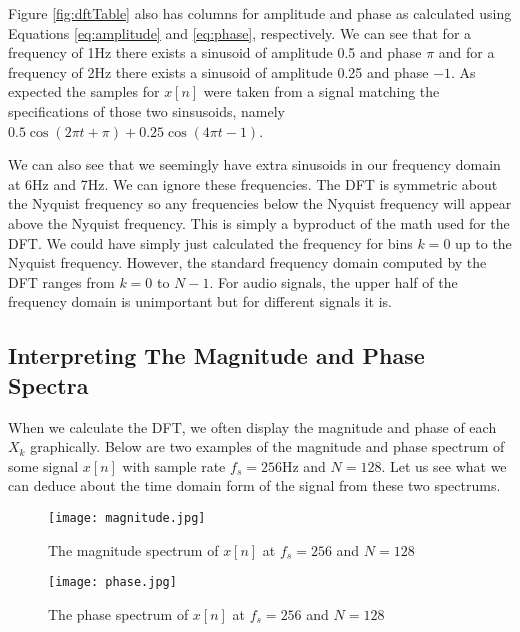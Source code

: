 Figure \ref{fig:dftTable} also has  columns for amplitude and phase as calculated using Equations 
\ref{eq:amplitude} and \ref{eq:phase},
respectively.  We can see that for a frequency of 1Hz there exists
 a sinusoid of amplitude 0.5 and phase $\pi$ and for a frequency of 2Hz there exists a sinusoid of 
 amplitude 0.25 and phase $-1$.  As expected the samples for $x[n]$ were taken from a signal 
 matching the specifications of those two sinsusoids, namely $0.5\cos(2\pi t + \pi) + 0.25\cos(4\pi t - 1)$.
 
 We can also see that we seemingly have extra sinusoids in our frequency domain at 6Hz and 7Hz.  
 We can ignore these frequencies.  The DFT is symmetric about the Nyquist frequency so any 
 frequencies below the Nyquist frequency will appear above the Nyquist frequency.  This is simply
 a byproduct of the math used for the DFT.  We could have simply just calculated the frequency
 for bins $k = 0$ up to the Nyquist frequency.  However, the standard frequency domain computed
 by the DFT ranges from $k = 0$ to $N - 1$.  For audio signals, the upper half of the frequency
 domain is unimportant but for different signals it is.
 
\subsection*{Interpreting The Magnitude and Phase Spectra}

When we calculate the DFT,  we often display the magnitude and phase of each $X_k$ graphically.  Below
are two examples of the magnitude and phase spectrum of some signal $x[n]$ with sample rate $f_s = 256$Hz and
$N = 128$.  Let us see what we can deduce about the time domain form of the signal from these two spectrums.

\begin{figure}[h]
	\caption{The magnitude spectrum of $x[n]$ at $f_s = 256$ and $N = 128$}
	\label{fig:magnitudeGraph}
	\begin{center}
	\texttt{[image: magnitude.jpg]}
	\end{center}
\end{figure}

\begin{figure}[h]
	\caption{The phase spectrum of $x[n]$ at $f_s = 256$ and $N = 128$}
	\label{fig:phaseGraph}
	\begin{center}
		\texttt{[image: phase.jpg]}
	\end{center}
\end{figure}

